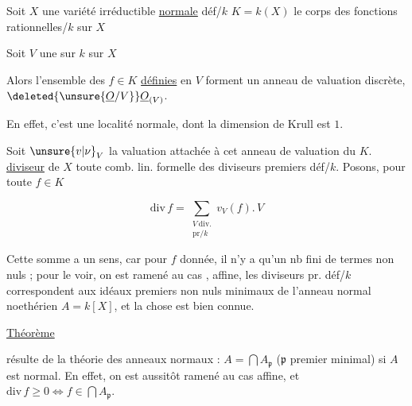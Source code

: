 

Soit $X$ une variété irréductible \uline{normale} déf/$k$ $K=k(X)$ le corps des fonctions rationnelles/$k$ sur $X$

Soit $V$ une  sur $k$ sur $X$

Alors l'ensemble des $f\in K$ \uline{définies} en $V$ forment un anneau de valuation discrète, $\deleted{\unsure{\underline O/V}}\underline O_{(V)}$.

En effet, c'est une  localité normale, dont la dimension de Krull est $1$.

Soit $\unsure{v|\nu}_V$ la valuation  attachée à cet anneau de valuation du $K$.  \uline{diviseur}  de $X$ toute comb. lin. formelle des diviseurs premiers  déf/$k$. Posons, pour toute $f\in K$

\[
\mathrm{div}\,f=\sum_{\substack{V\ \mathrm{div.}\\ \mathrm{pr}/k}}v_V(f).\,V
\]

Cette somme a un sens, car pour $f$ donnée, il n'y a qu'un nb fini de termes non nuls ;  pour le voir, on est ramené au cas , affine,  les diviseurs pr. déf/$k$ correspondent aux idéaux premiers non nuls minimaux de l'anneau normal noethérien $A=k[X]$, et la chose est bien connue.

\uline{Théorème}  

 résulte de la théorie des anneaux normaux : $A=\bigcap A_{\mathfrak p}$ ($\mathfrak p$ premier minimal) si $A$ est normal. En effet, on est aussitôt ramené au cas affine, et $\mathrm{div}\,f\geq0\Longleftrightarrow f\in\bigcap A_{\mathfrak p}$.

